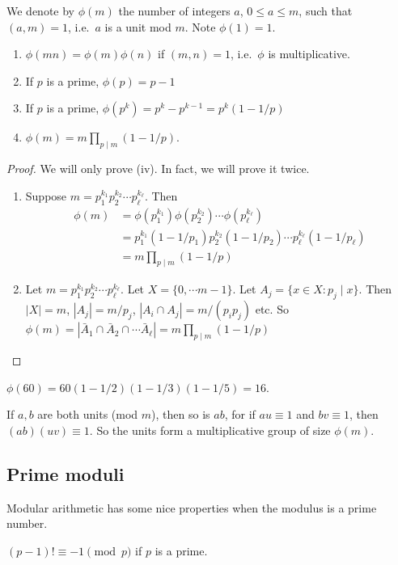 \documentclass[a4paper]{article}
\begin{document}
\begin{defi}
  We denote by $\phi(m)$ the number of integers $a$, $0\leq a\leq m$, such that $(a, m) = 1$, i.e.\ $a$ is a unit mod $m$. Note $\phi(1) = 1$.
\end{defi}

\begin{prop}\leavevmode
  \begin{enumerate}
    \item $\phi(mn) = \phi(m)\phi(n)$ if $(m, n) = 1$, i.e.\ $\phi$ is multiplicative.
    \item If $p$ is a prime, $\phi(p) = p - 1$
    \item If $p$ is a prime, $\phi(p^k) = p^k - p^{k - 1} = p^k(1 - 1/p)$
    \item $\phi(m) = m\prod_{p \mid m}(1 - 1/p)$.
  \end{enumerate}
\end{prop}

\begin{proof}
  We will only prove (iv). In fact, we will prove it twice.
  \begin{enumerate}
    \item Suppose $m = p_1^{k_1}p_2^{k_2}\cdots p_\ell^{k_\ell}$. Then
      \begin{align*}
        \phi(m) &= \phi(p_1^{k_1})\phi(p_2^{k_2})\cdots \phi(p_\ell^{k_\ell})\\
        &= p_1^{k_1}(1-1/p_1)p_2^{k_2}(1 - 1/p_2)\cdots p_\ell^{k_\ell}(1 - 1/p_\ell)\\
        &= m\prod_{p \mid m}(1 - 1/p)
      \end{align*}
    \item Let $m = p_1^{k_1}p_2^{k_2}\cdots p_\ell^{k_\ell}$. Let $X = \{0, \cdots m - 1\}$. Let $A_j = \{x\in X: p_j\mid x\}$. Then $|X| = m$, $|A_j| = m/p_j$, $|A_i\cap A_j| = m/(p_ip_j)$ etc. So $\phi(m) = |\bar A_1\cap \bar A_2\cap \cdots \bar A_\ell| = m\prod_{p \mid m}(1 - 1/p)$
  \end{enumerate}
\end{proof}

\begin{eg}
  $\phi(60) = 60(1 - 1/2)(1 - 1/3)(1 - 1/5) = 16$.
\end{eg}

If $a, b$ are both units (mod $m$), then so is $ab$, for if $au \equiv 1$ and $bv \equiv 1$, then $(ab)(uv)\equiv 1$. So the units form a multiplicative group of size $\phi(m)$.

\subsection{Prime moduli}
Modular arithmetic has some nice properties when the modulus is a prime number.
\begin{thm}
  $(p - 1)! \equiv -1\pmod p$ if $p$ is a prime.
\end{thm}
\end{document}
